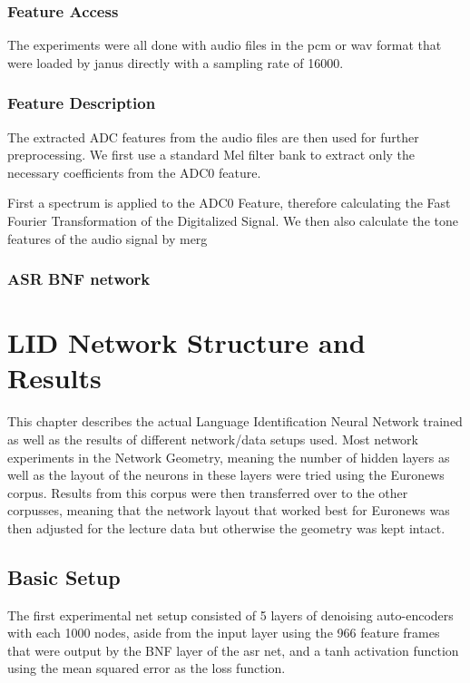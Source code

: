 \subsection{Feature Access}
\label{sec:FP:FA}

The experiments were all done with audio files in the pcm or wav format that were loaded by janus directly with a sampling rate of 16000. 

\subsection{Feature Description}
\label{sec:FP:FD}
The extracted ADC features from the audio files are then used for further preprocessing. We first use a standard Mel filter bank to extract only the necessary coefficients from the ADC0 feature. 

First a spectrum is applied to the ADC0 Feature, therefore calculating the Fast Fourier Transformation of the Digitalized Signal. We then also calculate the tone features of the audio signal by merg

\subsection{ASR BNF network}
\label{sec:FP:Net}


\chapter{LID Network Structure and Results}
\label{ch:LIDNetwork}

This chapter describes the actual Language Identification Neural Network trained as well as the results of different network/data setups used. Most network experiments in the Network Geometry, meaning the number of hidden layers as well as the layout of the neurons in these layers were tried using the Euronews corpus. Results from this corpus were then transferred over to the other corpusses, meaning that the network layout that worked best for Euronews was then adjusted for the lecture data but otherwise the geometry was kept intact.

\section{Basic Setup}
\label{sec:LIDNetwork:Basic}

The first experimental net setup consisted of 5 layers of denoising auto-encoders with each 1000 nodes, aside from the input layer using the 966 feature frames that were output by the BNF layer of the asr net, and a tanh activation function using the mean squared error as the loss function. 

